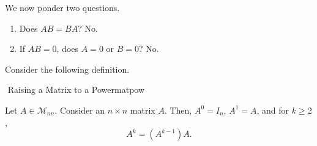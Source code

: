         We now ponder two questions.
        \begin{enumerate}
            \item Does \(AB=BA\)? No.
            \item If \(AB=0\), does \(A=0\) or \(B=0\)? No.
        \end{enumerate}
        Consider the following definition.
        \begin{definition}{\Stop\,\,Raising a Matrix to a Power}{matpow}

            Let \(A\in\mathcal{M}_{nn}\). Consider an \(n\times n\) matrix \(A\). Then, \(A^0=I_n\), \(A^1=A\), and for \(k\geq 2\),
            \begin{equation*}
                A^k=(A^{k-1})A.
            \end{equation*}
        \end{definition}
        
        